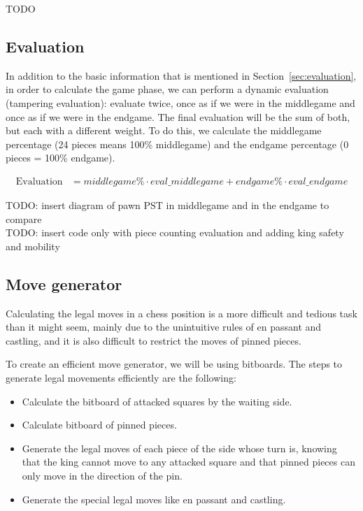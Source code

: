 TODO

\subsection{Evaluation}

In addition to the basic information that is mentioned in Section~\ref{sec:evaluation}, in order to calculate the game phase, we can perform a dynamic evaluation (tampering evaluation): evaluate twice, once as if we were in the middlegame and once as if we were in the endgame. The final evaluation will be the sum of both, but each with a different weight. To do this, we calculate the middlegame percentage (24 pieces means 100\% middlegame) and the endgame percentage (0 pieces = 100\% endgame).

\begin{align*}
\text{Evaluation} &= middlegame\% \cdot eval\_middlegame + endgame\% \cdot eval\_endgame
\end{align*}

\vspace{1em}

TODO: insert diagram of pawn PST in middlegame and in the endgame to compare\\
TODO: insert code only with piece counting evaluation and adding king safety and mobility

\subsection{Move generator}

Calculating the legal moves in a chess position is a more difficult and tedious task than it might seem, mainly due to the unintuitive rules of en passant and castling, and it is also difficult to restrict the moves of pinned pieces.~\cite{GenerateLegalMovesEfficiently}

\vspace{1em}

\noindent To create an efficient move generator, we will be using bitboards. The steps to generate legal movements efficiently are the following:

\begin{itemize}
  \item Calculate the bitboard of attacked squares by the waiting side.
  \item Calculate bitboard of pinned pieces.
  \item Generate the legal moves of each piece of the side whose turn is, knowing that the king cannot move to any attacked square and that pinned pieces can only move in the direction of the pin.
  \item Generate the special legal moves like en passant and castling.
\end{itemize}

